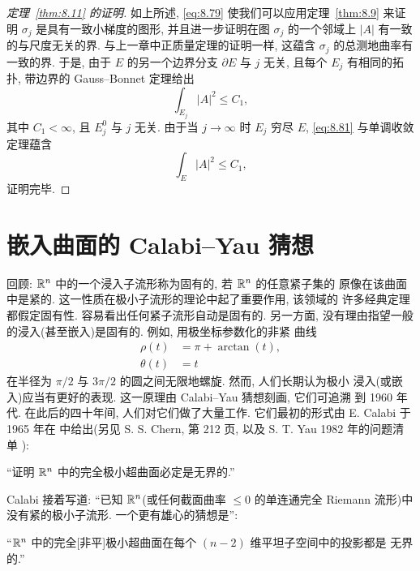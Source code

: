 \begin{proof}[定理~\ref{thm:8.11} 的证明]
如上所述, \eqref{eq:8.79} 使我们可以应用定理~\ref{thm:8.9} 来证明 $\sigma_j$
是具有一致小梯度的图形, 并且进一步证明在图 $\sigma_j$ 的一个邻域上 $|A|$
有一致的与尺度无关的界. 与上一章中正质量定理的证明一样, 这蕴含
$\sigma_j$ 的总测地曲率有一致的界. 于是, 由于 $E$ 的另一个边界分支
$\partial E$ 与 $j$ 无关, 且每个 $E_j$ 有相同的拓扑, 带边界的 Gauss--Bonnet
定理给出
\begin{equation}
\int_{E_j}|A|^2\leq C_1,
\label{eq:8.81}
\end{equation}
其中 $C_1<\infty$, 且 $E_j^0$ 与 $j$ 无关. 由于当 $j\to\infty$ 时 $E_j$ 穷尽
$E$, \eqref{eq:8.81} 与单调收敛定理蕴含
\begin{equation}
\int_E|A|^2\leq C_1,
\label{eq:8.82}
\end{equation}
证明完毕.
\end{proof}


\section{嵌入曲面的 Calabi--Yau 猜想}
\label{sec:8.4}

回顾: $\mathbb{R}^n$ 中的一个浸入子流形称为固有的, 若 $\mathbb{R}^n$ 的任意紧子集的
原像在该曲面中是紧的. 这一性质在极小子流形的理论中起了重要作用, 该领域的
许多经典定理都假定固有性. 容易看出任何紧子流形自动是固有的. 另一方面,
没有理由指望一般的浸入(甚至嵌入)是固有的. 例如, 用极坐标参数化的非紧
曲线
\[
\begin{aligned}
\rho(t)&=\pi+\arctan(t),\\
\theta(t)&=t
\end{aligned}
\]
在半径为 $\pi/2$ 与 $3\pi/2$ 的圆之间无限地螺旋. 然而, 人们长期认为极小
浸入(或嵌入)应当有更好的表现. 这一原理由 Calabi--Yau 猜想刻画, 它们可追溯
到 1960 年代. 在此后的四十年间, 人们对它们做了大量工作. 它们最初的形式由
E. Calabi 于 1965 年在 \cite{Ce} 中给出(另见 S. S. Chern, \cite{Ch1} 第 212 页,
以及 S. T. Yau 1982 年的问题清单 \cite{Ya4}):

\begin{conjecture}
\label{conj:8.13}
``证明 $\mathbb{R}^n$ 中的完全极小超曲面必定是无界的.''
\end{conjecture}

Calabi 接着写道: ``已知 $\mathbb{R}^n$(或任何截面曲率 $\leq0$ 的单连通完全 Riemann
流形)中没有紧的极小子流形. 一个更有雄心的猜想是'':

\begin{conjecture}
\label{conj:8.14}
``$\mathbb{R}^n$ 中的完全[非平]极小超曲面在每个 $(n-2)$ 维平坦子空间中的投影都是
无界的.''
\end{conjecture}

